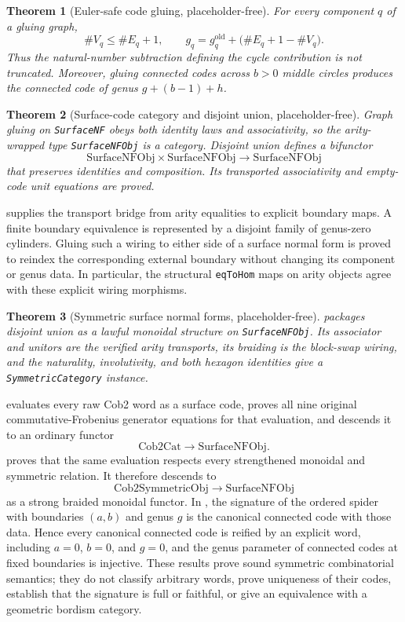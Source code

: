 \documentclass[11pt]{amsart}
\theoremstyle{plain}
\newtheorem{theorem}{Theorem}[section]
\theoremstyle{definition}
\begin{document}
\begin{theorem}[Euler-safe code gluing, placeholder-free]
For every component $q$ of a gluing graph,
\[
\#V_q\leq \#E_q+1,
\qquad
g_q=g_q^{\mathrm{old}}+\bigl(\#E_q+1-\#V_q\bigr).
\]
Thus the natural-number subtraction defining the cycle contribution is not truncated. Moreover, gluing connected codes across $b>0$ middle circles produces the connected code of genus $g+(b-1)+h$.
\end{theorem}

\begin{theorem}[Surface-code category and disjoint union, placeholder-free]
Graph gluing on \texttt{SurfaceNF} obeys both identity laws and associativity, so the arity-wrapped type \texttt{SurfaceNFObj} is a category. Disjoint union defines a bifunctor
\[
\mathrm{SurfaceNFObj}\times\mathrm{SurfaceNFObj}
\longrightarrow \mathrm{SurfaceNFObj}
\]
that preserves identities and composition. Its transported associativity and empty-code unit equations are proved.
\end{theorem}

 supplies the transport bridge from arity equalities to explicit boundary maps. A finite boundary equivalence is represented by a disjoint family of genus-zero cylinders. Gluing such a wiring to either side of a surface normal form is proved to reindex the corresponding external boundary without changing its component or genus data. In particular, the structural \texttt{eqToHom} maps on arity objects agree with these explicit wiring morphisms.

\begin{theorem}[Symmetric surface normal forms, placeholder-free]
 packages disjoint union as a lawful monoidal structure on \texttt{SurfaceNFObj}. Its associator and unitors are the verified arity transports, its braiding is the block-swap wiring, and the naturality, involutivity, and both hexagon identities give a \texttt{SymmetricCategory} instance.
\end{theorem}

 evaluates every raw Cob2 word as a surface code, proves all nine original commutative-Frobenius generator equations for that evaluation, and descends it to an ordinary functor
\[
\mathrm{Cob2Cat}\longrightarrow\mathrm{SurfaceNFObj}.
\]
 proves that the same evaluation respects every strengthened monoidal and symmetric relation. It therefore descends to
\[
\mathrm{Cob2SymmetricObj}\longrightarrow\mathrm{SurfaceNFObj}
\]
as a strong braided monoidal functor. In , the signature of the ordered spider with boundaries $(a,b)$ and genus $g$ is the canonical connected code with those data. Hence every canonical connected code is reified by an explicit word, including $a=0$, $b=0$, and $g=0$, and the genus parameter of connected codes at fixed boundaries is injective. These results prove sound symmetric combinatorial semantics; they do not classify arbitrary words, prove uniqueness of their codes, establish that the signature is full or faithful, or give an equivalence with a geometric bordism category.
\end{document}
